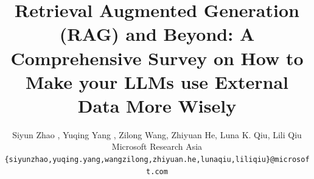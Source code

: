 


\newcommand{\eg}{\textit{e.g.,~}}
\newcommand{\etc}{\textit{etc.}}

\newcommand{\comment}[1]{\textcolor{ForestGreen}{\textit{Comment: #1}}}  
\newcommand{\outline}[1]{\textcolor{Blue}{\textit{\textbf{[#1]}}}}

\newcommand{\textquote}[1]{\textcolor{Gray}{#1}}
\newcommand{\yyq}[1]{\comment{#1}}  

\newcommand{\app}{data augmented LLM applications}

\newcommand{\firstlevel}{explicit fact queries}
\newcommand{\secondlevel}{implicit fact queries}
\newcommand{\thirdlevel}{interpretable rationale queries}
\newcommand{\forthlevel}{hidden rationale queries}



\title{\Large \bf Retrieval Augmented Generation (RAG) and Beyond: A Comprehensive Survey on How to Make your LLMs use External Data More Wisely}

\author{ 	
    Siyun Zhao ,  Yuqing Yang , Zilong Wang,  Zhiyuan He,  Luna K. Qiu,  Lili Qiu\\
    Microsoft Research Asia\\
	\texttt{\{siyunzhao,yuqing.yang,wangzilong,zhiyuan.he,lunaqiu,liliqiu\}@microsoft.com} \\
}